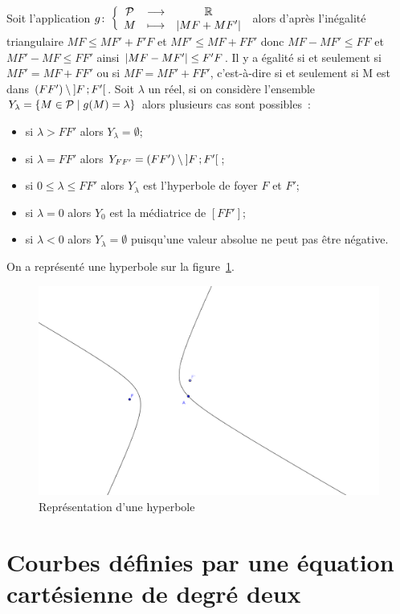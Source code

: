 Soit l'application $g\colon \left\{\begin{array}{ccc} \mathcal{P} & \longrightarrow &\mathbb{R}\\ M & \longmapsto & \left\lvert MF+MF'\right\rvert \end{array} \right.$ alors d'après l'inégalité triangulaire $MF \leq MF'+F'F$ et $MF'\leq MF+FF'$ donc $MF-MF'\leq FF$ et $MF'-MF\leq FF'$ ainsi $\left\lvert MF-MF'\right\rvert\leq F'F$. Il y a égalité si et seulement si $MF'=MF+FF'$ ou si $MF=MF'+FF'$, c'est-à-dire si et seulement si M est dans $(FF') \setminus \left] F \, ;  F' \right[$. Soit $\lambda$ un réel, si on considère l'ensemble $Y_{\lambda}=\left\{M \in \mathcal{P}\mathrel{}\middle|\mathrel{}g(M)=\lambda\right\}$ alors plusieurs cas sont possibles~:
\begin{itemize}
\item si $\lambda>FF'$ alors $Y_{\lambda}=\emptyset$;
\item si $\lambda=FF'$ alors $Y_{FF'}=(FF') \setminus \left] F \, ;  F' \right[$;
\item si $0\leq\lambda\leq FF'$ alors $Y_{\lambda}$ est l'hyperbole de foyer $F$ et $F'$;
\item si $\lambda=0$ alors $Y_{0}$ est la médiatrice de $[FF']$;
\item si $\lambda<0$ alors $Y_{\lambda}=\emptyset$ puisqu'une valeur absolue ne peut pas être négative.
\end{itemize}

On a représenté une hyperbole sur la figure~\ref{fig:hyperbole}.

\begin{figure}[!h]
  \centering
  \includegraphics[width=\textwidth]{./hyperbole.png}
  \caption{Représentation d'une hyperbole}
  \label{fig:hyperbole}
\end{figure}


\section{Courbes définies par une équation cartésienne de degré deux}
\label{sec:eqcart}
